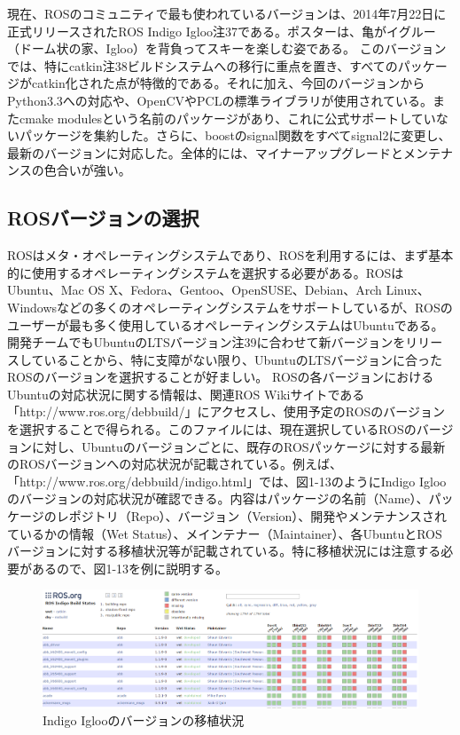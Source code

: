 現在、ROSのコミュニティで最も使われているバージョンは、2014年7月22日に正式リリースされたROS Indigo Igloo注37である。ポスターは、亀がイグルー（ドーム状の家、Igloo）を背負ってスキーを楽しむ姿である。
このバージョンでは、特にcatkin注38ビルドシステムへの移行に重点を置き、すべてのパッケージがcatkin化された点が特徴的である。それに加え、今回のバージョンからPython3.3への対応や、OpenCVやPCLの標準ライブラリが使用されている。またcmake modulesという名前のパッケージがあり、これに公式サポートしていないパッケージを集約した。さらに、boostのsignal関数をすべてsignal2に変更し、最新のバージョンに対応した。全体的には、マイナーアップグレードとメンテナンスの色合いが強い。

\subsection{ROSバージョンの選択}

ROSはメタ・オペレーティングシステムであり、ROSを利用するには、まず基本的に使用するオペレーティングシステムを選択する必要がある。ROSはUbuntu、Mac OS X、Fedora、Gentoo、OpenSUSE、Debian、Arch Linux、Windowsなどの多くのオペレーティングシステムをサポートしているが、ROSのユーザーが最も多く使用しているオペレーティングシステムはUbuntuである。開発チームでもUbuntuのLTSバージョン注39に合わせて新バージョンをリリースしていることから、特に支障がない限り、UbuntuのLTSバージョンに合ったROSのバージョンを選択することが好ましい。
ROSの各バージョンにおけるUbuntuの対応状況に関する情報は、関連ROS Wikiサイトである「http://www.ros.org/debbuild/」にアクセスし、使用予定のROSのバージョンを選択することで得られる。このファイルには、現在選択しているROSのバージョンに対し、Ubuntuのバージョンごとに、既存のROSパッケージに対する最新のROSバージョンへの対応状況が記載されている。例えば、「http://www.ros.org/debbuild/indigo.html」では、図1-13のようにIndigo Iglooのバージョンの対応状況が確認できる。内容はパッケージの名前（Name）、パッケージのレポジトリ（Repo）、バージョン（Version）、開発やメンテナンスされているかの情報（Wet Status）、メインテナー（Maintainer）、各UbuntuとROSバージョンに対する移植状況等が記載されている。特に移植状況には注意する必要があるので、図1-13を例に説明する。

\begin{figure}[h]
  \centering
  \includegraphics[width=\columnwidth]{pictures/chapter1/pic_01_09.png}
  \caption{Indigo Iglooのバージョンの移植状況}
\end{figure}

